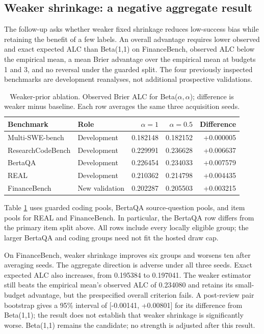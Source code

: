 \documentclass{article}
\begin{document}
\subsection{Weaker shrinkage: a negative aggregate result}\label{weaker-shrinkage-a-negative-aggregate-result}

The follow-up asks whether weaker fixed shrinkage reduces low-success bias while retaining the benefit of a few labels. An overall advantage requires lower observed and exact expected ALC than Beta(1,1) on FinanceBench, observed ALC below the empirical mean, a mean Brier advantage over the empirical mean at budgets 1 and 3, and no reversal under the guarded split. The four previously inspected benchmarks are development reanalyses, not additional prospective validations.

\begin{table}[ht]
\centering
\caption{Weaker-prior ablation. Observed Brier ALC for Beta($\alpha,\alpha$); difference is weaker minus baseline. Each row averages the same three acquisition seeds.}
\label{tab:weaker}
\small
\begin{tabular}{llrrr}
\toprule
Benchmark & Role & $\alpha=1$ & $\alpha=0.5$ & Difference \\
\midrule
Multi-SWE-bench & Development & 0.182148 & 0.182152 & +0.000005 \\
ResearchCodeBench & Development & 0.229991 & 0.236628 & +0.006637 \\
BertaQA & Development & 0.226454 & 0.234033 & +0.007579 \\
REAL & Development & 0.210362 & 0.214798 & +0.004435 \\
FinanceBench & New validation & 0.202287 & 0.205503 & +0.003215 \\
\bottomrule
\end{tabular}
\end{table}

Table \ref{tab:weaker} uses guarded coding pools, BertaQA source-question pools, and item pools for REAL and FinanceBench. In particular, the BertaQA row differs from the primary item split above. All rows include every locally eligible group; the larger BertaQA and coding groups need not fit the hosted draw cap.

On FinanceBench, weaker shrinkage improves six groups and worsens ten after averaging seeds. The aggregate direction is adverse under all three seeds. Exact expected ALC also increases, from 0.195384 to 0.197041. The weaker estimator still beats the empirical mean's observed ALC of 0.234080 and retains its small-budget advantage, but the prespecified overall criterion fails. A post-review pair bootstrap gives a 95\% interval of [-0.00141, +0.00801] for its difference from Beta(1,1); the result does not establish that weaker shrinkage is significantly worse. Beta(1,1) remains the candidate; no strength is adjusted after this result.
\end{document}
